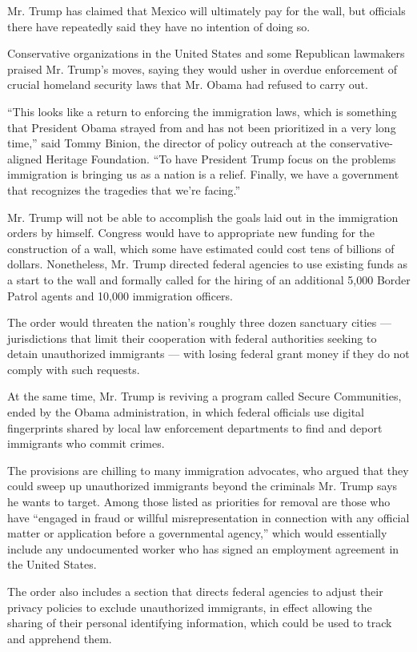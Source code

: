 Mr. Trump has claimed that Mexico will ultimately pay for the wall, but
officials there have repeatedly said they have no intention of doing so.

Conservative organizations in the United States and some Republican
lawmakers praised Mr. Trump's moves, saying they would usher in overdue
enforcement of crucial homeland security laws that Mr. Obama had refused
to carry out.

``This looks like a return to enforcing the immigration laws, which is
something that President Obama strayed from and has not been prioritized
in a very long time,'' said Tommy Binion, the director of policy
outreach at the conservative-aligned Heritage Foundation. ``To have
President Trump focus on the problems immigration is bringing us as a
nation is a relief. Finally, we have a government that recognizes the
tragedies that we're facing.''

Mr. Trump will not be able to accomplish the goals laid out in the
immigration orders by himself. Congress would have to appropriate new
funding for the construction of a wall, which some have estimated could
cost tens of billions of dollars. Nonetheless, Mr. Trump directed
federal agencies to use existing funds as a start to the wall and
formally called for the hiring of an additional 5,000 Border Patrol
agents and 10,000 immigration officers.

The order would threaten the nation's roughly three dozen sanctuary
cities --- jurisdictions that limit their cooperation with federal
authorities seeking to detain unauthorized immigrants --- with losing
federal grant money if they do not comply with such requests.

At the same time, Mr. Trump is reviving a program called Secure
Communities, ended by the Obama administration, in which federal
officials use digital fingerprints shared by local law enforcement
departments to find and deport immigrants who commit crimes.

The provisions are chilling to many immigration advocates, who argued
that they could sweep up unauthorized immigrants beyond the criminals
Mr. Trump says he wants to target. Among those listed as priorities for
removal are those who have ``engaged in fraud or willful
misrepresentation in connection with any official matter or application
before a governmental agency,'' which would essentially include any
undocumented worker who has signed an employment agreement in the United
States.

The order also includes a section that directs federal agencies to
adjust their privacy policies to exclude unauthorized immigrants, in
effect allowing the sharing of their personal identifying information,
which could be used to track and apprehend them.

